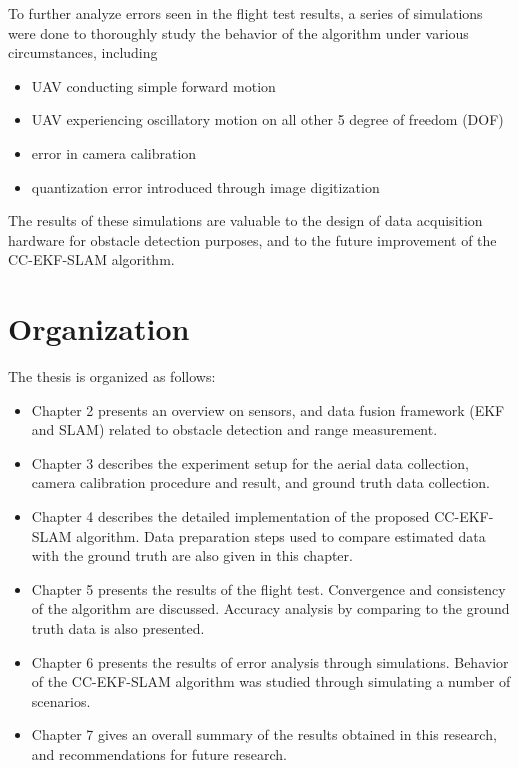 To further analyze errors seen in the flight test results, a series
of simulations were done to thoroughly study the behavior of the
algorithm under various circumstances, including
\begin{itemize}
\item UAV conducting simple forward motion
\item UAV experiencing oscillatory motion on all other 5 degree of
freedom (DOF)
\item error in camera calibration
\item quantization error introduced through image digitization 
\end{itemize}
The results of these simulations are valuable to the design of data
acquisition hardware for obstacle detection purposes, and to the future
improvement of the CC-EKF-SLAM algorithm.

\section{Organization}\label{section:Organization}
The thesis is organized as follows:

\begin{itemize}
  \item Chapter 2 presents an overview on sensors, and data fusion
  framework (EKF and SLAM) related to obstacle detection and range
  measurement.
  \item Chapter 3 describes the experiment setup for the aerial data
  collection, camera calibration procedure and result, and ground
  truth data collection.
  \item Chapter 4 describes the detailed implementation of the proposed
  CC-EKF-SLAM algorithm. Data preparation steps used to compare
  estimated data with the ground truth are also given in this chapter.
  \item Chapter 5 presents the results of the flight test. Convergence and
  consistency of the algorithm are discussed. Accuracy analysis by
  comparing to the ground truth data is also presented.
  \item Chapter 6 presents the results of error analysis through
  simulations. Behavior of the CC-EKF-SLAM
  algorithm was studied through simulating a number of scenarios.
  \item Chapter 7 gives an overall summary of the results obtained in
  this research, and recommendations for future research.
\end{itemize}

